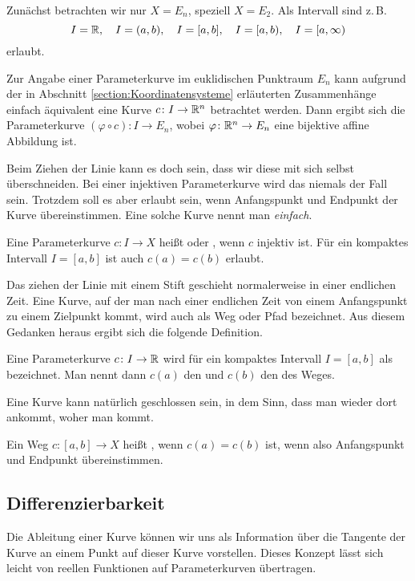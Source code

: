 \noindent
Zunächst betrachten wir nur $X=E_n$, speziell $X=E_2$. Als Intervall
sind z.\,B.%
\[I=\mathbb R,\quad I=(a,b),\quad I=[a,b],\quad
I=[a,b),\quad I=[a,\infty)\]
erlaubt.

Zur Angabe einer Parameterkurve im euklidischen Punktraum $E_n$ kann
aufgrund der in Abschnitt \ref{section:Koordinatensysteme} erläuterten
Zusammenhänge einfach äquivalent eine Kurve $c\colon I \to\mathbb R^n$
betrachtet werden. Dann ergibt sich die Parameterkurve
$(\varphi\circ c)\colon I\to E_n$,
wobei $\varphi\colon \mathbb R^n\to E_n$ eine bijektive affine Abbildung ist.

Beim Ziehen der Linie kann es doch sein, dass wir diese mit sich selbst
überschneiden. Bei einer injektiven Parameterkurve wird das niemals
der Fall sein. Trotzdem soll es aber erlaubt sein, wenn Anfangspunkt
und Endpunkt der Kurve übereinstimmen. Eine solche Kurve nennt man
\emph{einfach}.

\begin{definition}
Eine Parameterkurve $c\colon I\to X$ heißt  oder
, wenn $c$ injektiv ist. Für ein kompaktes
Intervall $I=[a,b]$ ist auch $c(a)=c(b)$ erlaubt.
\end{definition}

\noindent
Das ziehen der Linie mit einem Stift geschieht normalerweise in einer
endlichen Zeit. Eine Kurve, auf der man nach einer endlichen Zeit
von einem Anfangspunkt zu einem Zielpunkt kommt, wird auch als
Weg oder Pfad bezeichnet. Aus diesem Gedanken heraus
ergibt sich die folgende Definition.

\begin{definition}
Eine Parameterkurve $c\colon I\to\mathbb R$ wird für ein kompaktes
Intervall $I=[a,b]$ als  bezeichnet. Man nennt dann
$c(a)$ den  und $c(b)$ den
 des Weges.
\end{definition}

\noindent
Eine Kurve kann natürlich geschlossen sein, in dem Sinn, dass man
wieder dort ankommt, woher man kommt.

\begin{definition}
Ein Weg $c\colon [a,b]\to X$ heißt ,
wenn $c(a)=c(b)$ ist, wenn also Anfangspunkt und
Endpunkt übereinstimmen.
\end{definition}

\subsection{Differenzierbarkeit}
Die Ableitung einer Kurve können wir uns als Information über die
Tangente der Kurve an einem Punkt auf dieser Kurve vorstellen. Dieses
Konzept lässt sich leicht von reellen Funktionen auf Parameterkurven
übertragen.

